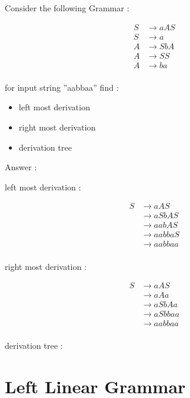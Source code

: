 \documentclass[12pt]{book}
\begin{document}
Consider the following Grammar :

\begin{align*}
S &\to aAS \\
S &\to a \\
A &\to SbA \\
A &\to SS \\
A &\to ba \\
\end{align*}

for input string ''aabbaa'' find :

\begin{itemize}
	\item left most derivation
	\item right most derivation
	\item derivation tree
\end{itemize}


Answer :

left most derivation :

\begin{align*}
S &\to aAS \\
&\to aSbAS \\
&\to aabAS \\
&\to aabbaS \\
&\to aabbaa \\
\end{align*}

right most derivation :

\begin{align*}
S &\to aAS \\
&\to aAa \\
&\to aSbAa \\
&\to aSbbaa \\
&\to aabbaa \\
\end{align*}

derivation tree :



\section{Left Linear Grammar}
\end{document}
